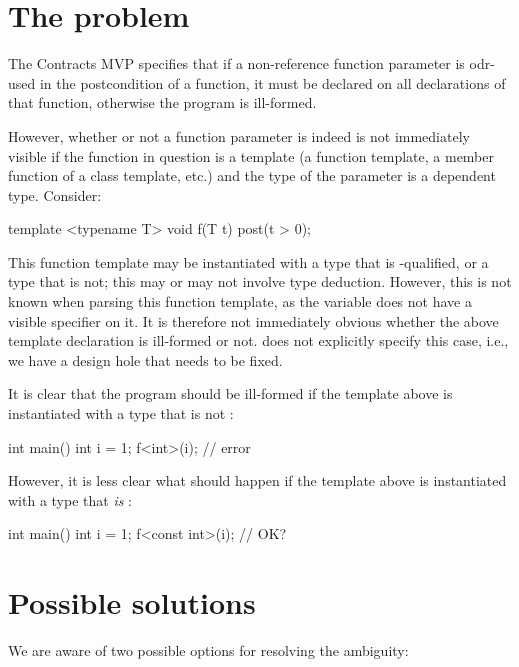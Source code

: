 \section{The problem}

The Contracts MVP \cite{P2900R10} specifies that if a non-reference function parameter is odr-used in the postcondition of a function, it must be declared  on all declarations of that function, otherwise the program is ill-formed.

However, whether or not a function parameter is indeed  is not immediately visible if the function in question is a template (a function template, a member function of a class template, etc.) and the type of the parameter is a dependent type. Consider:
\begin{codeblock}
template <typename T> 
void f(T t) post(t > 0); 
\end{codeblock}
This function template may be instantiated with a type that is -qualified, or a type that is not; this may or may not involve type deduction. However, this is not known when parsing this function template, as the variable  does not have a visible  specifier on it. It is therefore not immediately obvious whether the above template declaration is ill-formed or not. \cite{P2900R10} does not explicitly specify this case, i.e., we have a design hole that needs to be fixed.

It is clear that the program should be ill-formed if the template above is instantiated with a type  that is not :
\begin{codeblock}
int main() {
  int i = 1;
  f<int>(i);  // error
}
\end{codeblock}
However, it is less clear what should happen if the template above is instantiated with a type  that \emph{is} :
\begin{codeblock}
int main() {
  int i = 1;
  f<const int>(i);  // OK?
}
\end{codeblock}

\section{Possible solutions}

We are aware of two possible options for resolving the ambiguity:


\renewcommand\labelenumi{D\arabic{enumi}.}
\renewcommand\theenumi\labelenumi

